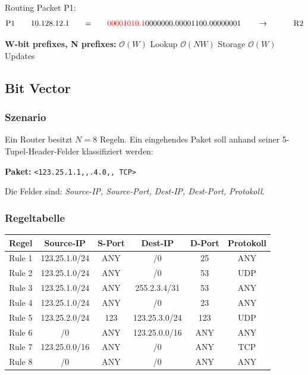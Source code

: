 \documentclass{article}
\begin{document}
        \begin{center}
            Routing Packet P1:
            \begin{align*}
            \text{P1} & ~~~ && 10.128.12.1 &&& = &&&& \textcolor{red}{00001010.1}0000000.00001100.00000001 &&&&& \to\ &&&&&& \text{R2} \\
            \end{align*}
        \end{center}

    \textbf{W-bit prefixes, N prefixes:} \quad $\mathcal{O}(W)$ Lookup \quad $\mathcal{O}(NW)$ Storage \quad $\mathcal{O}(W)$ Updates

    \subsection{Bit Vector}


\subsubsection*{Szenario}

Ein Router besitzt $N = 8$ Regeln. Ein eingehendes Paket soll anhand seiner
5-Tupel-Header-Felder klassifiziert werden:

\medskip
\begin{center}
\textbf{Paket:}
\quad \texttt{<123.25.1.1,,.4.0,,\; TCP>}
\end{center}

\medskip
\noindent Die Felder sind: \textit{Source-IP, Source-Port, Dest-IP, Dest-Port, Protokoll}.

\subsubsection*{Regeltabelle}

\begin{center}
\begin{tabular}{lccccc}
\toprule
\textbf{Regel} & \textbf{Source-IP} & \textbf{S-Port} & \textbf{Dest-IP} & \textbf{D-Port} & \textbf{Protokoll} \\
\midrule
Rule 1 & 123.25.1.0/24 & ANY & /0          & 25  & ANY \\
Rule 2 & 123.25.1.0/24 & ANY & /0          & 53  & UDP \\
Rule 3 & 123.25.1.0/24 & ANY & 255.2.3.4/31 & 53 & ANY \\
Rule 4 & 123.25.1.0/24 & ANY & /0          & 23  & ANY \\
Rule 5 & 123.25.2.0/24 & 123 & 123.25.3.0/24 & 123 & UDP \\
Rule 6 & /0            & ANY & 123.25.0.0/16 & ANY & ANY \\
Rule 7 & 123.25.0.0/16 & ANY & /0          & ANY & TCP \\
Rule 8 & /0            & ANY & /0          & ANY & ANY \\
\bottomrule
\end{tabular}
\end{center}
\end{document}
